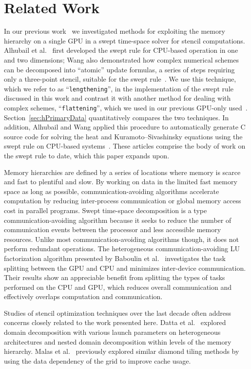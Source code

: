 
\section{Related Work} \label{sec:hRwork}

In our previous work~\cite{OurJCP} we investigated methods for exploiting the memory hierarchy on a single GPU in a swept time-space solver for stencil computations. 
Alhubail et al.~\cite{MaithamRepo, alhubail:16jcp, Alhubail:2016arxiv} first developed the swept rule for CPU-based operation in one and two dimensions; Wang also demonstrated how complex numerical schemes can be decomposed into ``atomic'' update formulas, a series of steps requiring only a three-point stencil, suitable for the swept rule~\cite{WangDecomp}.
We use this technique, which we refer to as ``\texttt{lengthening}'', in the implementation of the swept rule discussed in this work
and contrast it with another method for dealing with complex schemes, ``\texttt{flattening}'', which we used in our previous GPU-only used~\cite{OurJCP}.
Section~\ref{sec:hPrimaryData} quantitatively compares the two techniques. 
In addition, Alhubail and Wang applied this procedure to automatically generate C source code for solving the heat and Kuramoto--Sivashinsky equations using the swept rule on CPU-based systems~\cite{AIAAWang}.
These articles comprise the body of work on the swept rule to date, which this paper expands upon.

Memory hierarchies are defined by a series of locations where memory is scarce and fast to plentiful and slow.
By working on data in the limited fast memory space as long as possible, communication-avoiding algorithms accelerate computation by reducing inter-process communication or global memory access cost in parallel programs.
Swept time-space decomposition is a type communication-avoiding algorithm because it seeks to reduce the number of communication events between the processor and less accessible memory resources.
Unlike most communication-avoiding algorithms though, it does not perform redundant operations.
The heterogeneous communication-avoiding LU factorization algorithm presented by Baboulin et al.~\cite{BABOULIN201217} investigates the task splitting between the GPU and CPU and minimizes inter-device communication.
Their results show an appreciable benefit from splitting the types of tasks performed on the CPU and GPU, which reduces overall communication and effectively overlaps computation and communication.

Studies of stencil optimization techniques over the last decade often address concerns closely related to the work presented here.
Datta et al.~\cite{VolkovDatta2008} explored domain decomposition with various launch parameters on heterogeneous architectures and nested domain decomposition within levels of the memory hierarchy.
Malas et al.~\cite{MalasHager} previously explored similar diamond tiling methods by using the data dependency of the grid to improve cache usage.

